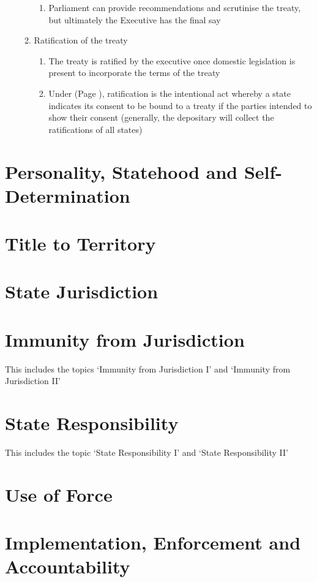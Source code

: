 \begin{enumerate}
\begin{enumerate}
\begin{enumerate}
            \item Parliament can provide recommendations and scrutinise the treaty, but ultimately the Executive has the final say
        \end{enumerate}
        \item Ratification of the treaty
        \begin{enumerate}
            \item The treaty is ratified by the executive once domestic legislation is present to incorporate the terms of the treaty
            \item Under  (Page \pageref{VCLT Art 2}), ratification is the intentional act whereby a state indicates its consent to be bound to a treaty if the parties intended to show their consent (generally, the depositary will collect the ratifications of all states)
        \end{enumerate}
    \end{enumerate}
\end{enumerate}

\section{Personality, Statehood and Self-Determination}

\section{Title to Territory}

\section{State Jurisdiction}

\section{Immunity from Jurisdiction}
This includes the topics `Immunity from Jurisdiction I' and `Immunity from Jurisdiction II'

\section{State Responsibility}
This includes the topic `State Responsibility I' and `State Responsibility II'

\section{Use of Force}

\section{Implementation, Enforcement and Accountability}